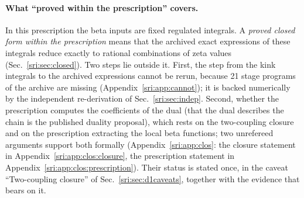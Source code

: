 \paragraph{What ``proved within the prescription'' covers.} In this prescription the beta inputs are fixed
regulated integrals. A \emph{proved closed form within the prescription} means that the archived exact expressions of
these integrals reduce exactly to rational combinations of zeta values (Sec.~\ref{sri:sec:closed}). Two steps lie outside
it. First, the step from the kink integrals to the archived expressions cannot be rerun, because 21 stage programs of
the archive are missing (Appendix~\ref{sri:app:cannot}); it is backed numerically by the independent re-derivation of
Sec.~\ref{sri:sec:indep}. Second, whether the prescription computes the coefficients of the dual (that the dual
describes the chain is the published duality proposal), which rests on the two-coupling closure and on the prescription extracting the local beta functions; two unrefereed arguments support
both formally (Appendix~\ref{sri:app:clos}: the closure statement in Appendix~\ref{sri:app:clos:closure}, the prescription
statement in Appendix~\ref{sri:app:clos:prescription}). Their status is stated once, in the caveat ``Two-coupling
closure'' of Sec.~\ref{sri:sec:d1caveats}, together with the evidence that bears on it.

